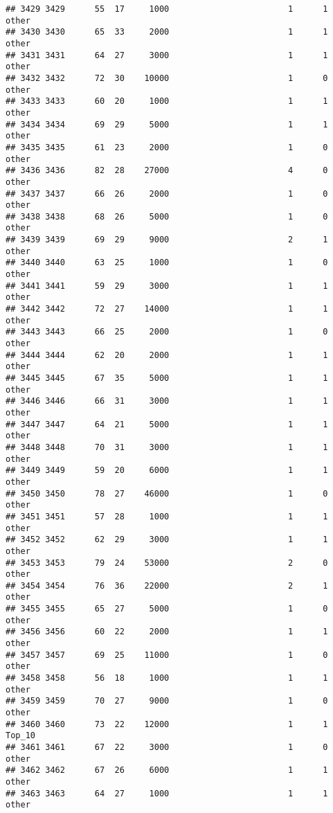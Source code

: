 \documentclass[
]{article}
\begin{document}
\begin{verbatim}
## 3429 3429      55  17     1000                        1      1    other
## 3430 3430      65  33     2000                        1      1    other
## 3431 3431      64  27     3000                        1      1    other
## 3432 3432      72  30    10000                        1      0    other
## 3433 3433      60  20     1000                        1      1    other
## 3434 3434      69  29     5000                        1      1    other
## 3435 3435      61  23     2000                        1      0    other
## 3436 3436      82  28    27000                        4      0    other
## 3437 3437      66  26     2000                        1      0    other
## 3438 3438      68  26     5000                        1      0    other
## 3439 3439      69  29     9000                        2      1    other
## 3440 3440      63  25     1000                        1      0    other
## 3441 3441      59  29     3000                        1      1    other
## 3442 3442      72  27    14000                        1      1    other
## 3443 3443      66  25     2000                        1      0    other
## 3444 3444      62  20     2000                        1      1    other
## 3445 3445      67  35     5000                        1      1    other
## 3446 3446      66  31     3000                        1      1    other
## 3447 3447      64  21     5000                        1      1    other
## 3448 3448      70  31     3000                        1      1    other
## 3449 3449      59  20     6000                        1      1    other
## 3450 3450      78  27    46000                        1      0    other
## 3451 3451      57  28     1000                        1      1    other
## 3452 3452      62  29     3000                        1      1    other
## 3453 3453      79  24    53000                        2      0    other
## 3454 3454      76  36    22000                        2      1    other
## 3455 3455      65  27     5000                        1      0    other
## 3456 3456      60  22     2000                        1      1    other
## 3457 3457      69  25    11000                        1      0    other
## 3458 3458      56  18     1000                        1      1    other
## 3459 3459      70  27     9000                        1      0    other
## 3460 3460      73  22    12000                        1      1   Top_10
## 3461 3461      67  22     3000                        1      0    other
## 3462 3462      67  26     6000                        1      1    other
## 3463 3463      64  27     1000                        1      1    other

\end{verbatim}
\end{document}
